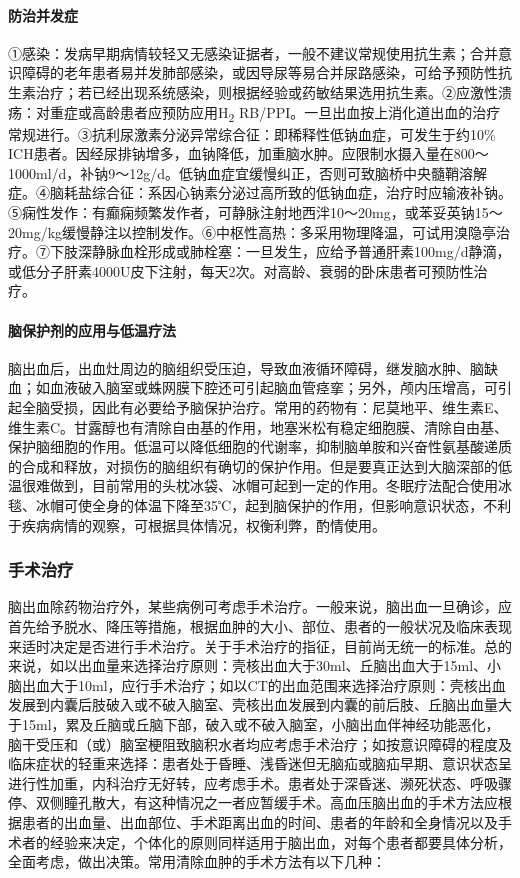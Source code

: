 \paragraph{防治并发症}

①感染：发病早期病情较轻又无感染证据者，一般不建议常规使用抗生素；合并意识障碍的老年患者易并发肺部感染，或因导尿等易合并尿路感染，可给予预防性抗生素治疗；若已经出现系统感染，则根据经验或药敏结果选用抗生素。②应激性溃疡：对重症或高龄患者应预防应用H\textsubscript{2}
RB/PPI。一旦出血按上消化道出血的治疗常规进行。③抗利尿激素分泌异常综合征：即稀释性低钠血症，可发生于约10\%
ICH患者。因经尿排钠增多，血钠降低，加重脑水肿。应限制水摄入量在800～1000ml/d，补钠9～12g/d。低钠血症宜缓慢纠正，否则可致脑桥中央髓鞘溶解症。④脑耗盐综合征：系因心钠素分泌过高所致的低钠血症，治疗时应输液补钠。⑤痫性发作：有癫痫频繁发作者，可静脉注射地西泮10～20mg，或苯妥英钠15～20mg/kg缓慢静注以控制发作。⑥中枢性高热：多采用物理降温，可试用溴隐亭治疗。⑦下肢深静脉血栓形成或肺栓塞：一旦发生，应给予普通肝素100mg/d静滴，或低分子肝素4000U皮下注射，每天2次。对高龄、衰弱的卧床患者可预防性治疗。

\paragraph{脑保护剂的应用与低温疗法}

脑出血后，出血灶周边的脑组织受压迫，导致血液循环障碍，继发脑水肿、脑缺血；如血液破入脑室或蛛网膜下腔还可引起脑血管痉挛；另外，颅内压增高，可引起全脑受损，因此有必要给予脑保护治疗。常用的药物有：尼莫地平、维生素E、维生素C。甘露醇也有清除自由基的作用，地塞米松有稳定细胞膜、清除自由基、保护脑细胞的作用。低温可以降低细胞的代谢率，抑制脑单胺和兴奋性氨基酸递质的合成和释放，对损伤的脑组织有确切的保护作用。但是要真正达到大脑深部的低温很难做到，目前常用的头枕冰袋、冰帽可起到一定的作用。冬眠疗法配合使用冰毯、冰帽可使全身的体温下降至35℃，起到脑保护的作用，但影响意识状态，不利于疾病病情的观察，可根据具体情况，权衡利弊，酌情使用。

\subsubsection{手术治疗}

脑出血除药物治疗外，某些病例可考虑手术治疗。一般来说，脑出血一旦确诊，应首先给予脱水、降压等措施，根据血肿的大小、部位、患者的一般状况及临床表现来适时决定是否进行手术治疗。关于手术治疗的指征，目前尚无统一的标准。总的来说，如以出血量来选择治疗原则：壳核出血大于30ml、丘脑出血大于15ml、小脑出血大于10ml，应行手术治疗；如以CT的出血范围来选择治疗原则：壳核出血发展到内囊后肢破入或不破入脑室、壳核出血发展到内囊的前后肢、丘脑出血量大于15ml，累及丘脑或丘脑下部，破入或不破入脑室，小脑出血伴神经功能恶化，脑干受压和（或）脑室梗阻致脑积水者均应考虑手术治疗；如按意识障碍的程度及临床症状的轻重来选择：患者处于昏睡、浅昏迷但无脑疝或脑疝早期、意识状态呈进行性加重，内科治疗无好转，应考虑手术。患者处于深昏迷、濒死状态、呼吸骤停、双侧瞳孔散大，有这种情况之一者应暂缓手术。高血压脑出血的手术方法应根据患者的出血量、出血部位、手术距离出血的时间、患者的年龄和全身情况以及手术者的经验来决定，个体化的原则同样适用于脑出血，对每个患者都要具体分析，全面考虑，做出决策。常用清除血肿的手术方法有以下几种：

